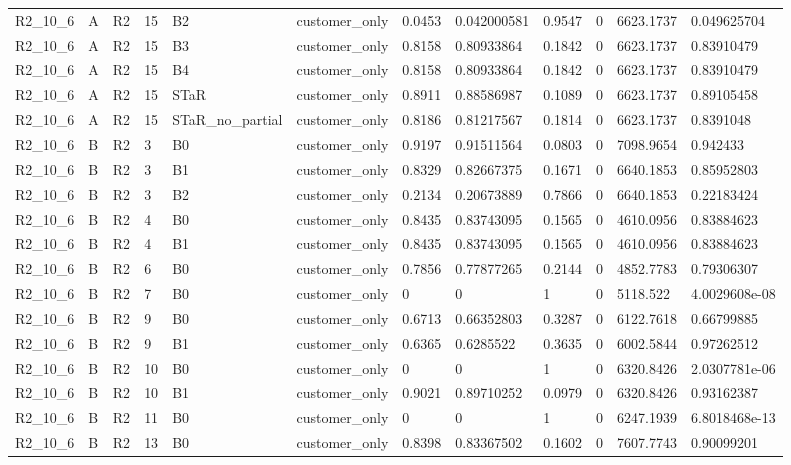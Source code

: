 \begin{longtable}{llllllllllll}
R2\_10\_6 & A & R2 & 15 & B2 & customer\_only & 0.0453 & 0.042000581 & 0.9547 & 0 & 6623.1737 & 0.049625704 \\
R2\_10\_6 & A & R2 & 15 & B3 & customer\_only & 0.8158 & 0.80933864 & 0.1842 & 0 & 6623.1737 & 0.83910479 \\
R2\_10\_6 & A & R2 & 15 & B4 & customer\_only & 0.8158 & 0.80933864 & 0.1842 & 0 & 6623.1737 & 0.83910479 \\
R2\_10\_6 & A & R2 & 15 & STaR & customer\_only & 0.8911 & 0.88586987 & 0.1089 & 0 & 6623.1737 & 0.89105458 \\
R2\_10\_6 & A & R2 & 15 & STaR\_no\_partial & customer\_only & 0.8186 & 0.81217567 & 0.1814 & 0 & 6623.1737 & 0.8391048 \\
R2\_10\_6 & B & R2 & 3 & B0 & customer\_only & 0.9197 & 0.91511564 & 0.0803 & 0 & 7098.9654 & 0.942433 \\
R2\_10\_6 & B & R2 & 3 & B1 & customer\_only & 0.8329 & 0.82667375 & 0.1671 & 0 & 6640.1853 & 0.85952803 \\
R2\_10\_6 & B & R2 & 3 & B2 & customer\_only & 0.2134 & 0.20673889 & 0.7866 & 0 & 6640.1853 & 0.22183424 \\
R2\_10\_6 & B & R2 & 4 & B0 & customer\_only & 0.8435 & 0.83743095 & 0.1565 & 0 & 4610.0956 & 0.83884623 \\
R2\_10\_6 & B & R2 & 4 & B1 & customer\_only & 0.8435 & 0.83743095 & 0.1565 & 0 & 4610.0956 & 0.83884623 \\
R2\_10\_6 & B & R2 & 6 & B0 & customer\_only & 0.7856 & 0.77877265 & 0.2144 & 0 & 4852.7783 & 0.79306307 \\
R2\_10\_6 & B & R2 & 7 & B0 & customer\_only & 0 & 0 & 1 & 0 & 5118.522 & 4.0029608e-08 \\
R2\_10\_6 & B & R2 & 9 & B0 & customer\_only & 0.6713 & 0.66352803 & 0.3287 & 0 & 6122.7618 & 0.66799885 \\
R2\_10\_6 & B & R2 & 9 & B1 & customer\_only & 0.6365 & 0.6285522 & 0.3635 & 0 & 6002.5844 & 0.97262512 \\
R2\_10\_6 & B & R2 & 10 & B0 & customer\_only & 0 & 0 & 1 & 0 & 6320.8426 & 2.0307781e-06 \\
R2\_10\_6 & B & R2 & 10 & B1 & customer\_only & 0.9021 & 0.89710252 & 0.0979 & 0 & 6320.8426 & 0.93162387 \\
R2\_10\_6 & B & R2 & 11 & B0 & customer\_only & 0 & 0 & 1 & 0 & 6247.1939 & 6.8018468e-13 \\
R2\_10\_6 & B & R2 & 13 & B0 & customer\_only & 0.8398 & 0.83367502 & 0.1602 & 0 & 7607.7743 & 0.90099201 \\

\end{longtable}

